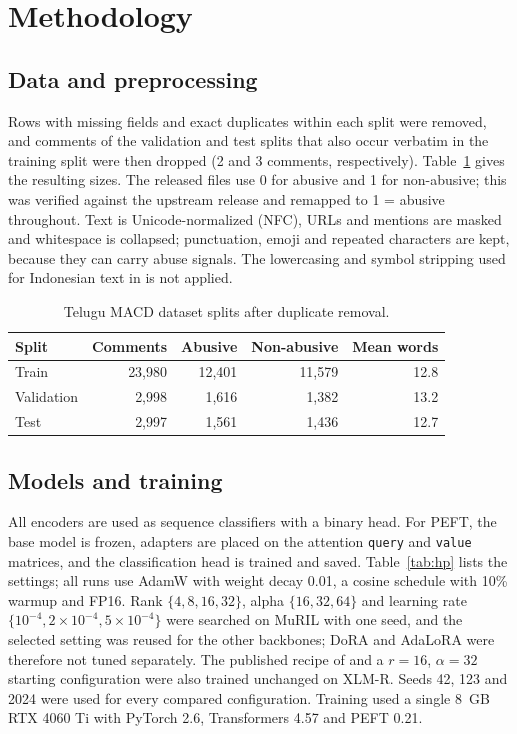 \documentclass{svproc}
\begin{document}
\section{Methodology}
\label{sec:method}
\subsection{Data and preprocessing}
Rows with missing fields and exact duplicates within each split were removed, and comments of the validation and test splits that also occur verbatim in the training split were then dropped (2 and 3 comments, respectively). Table~\ref{tab:data} gives the resulting sizes. The released files use 0 for abusive and 1 for non-abusive; this was verified against the upstream release and remapped to 1 = abusive throughout. Text is Unicode-normalized (NFC), URLs and mentions are masked and whitespace is collapsed; punctuation, emoji and repeated characters are kept, because they can carry abuse signals. The lowercasing and symbol stripping used for Indonesian text in \cite{kaunang2026indo} is not applied.

\begin{table}[t]
\caption{Telugu MACD dataset splits after duplicate removal.}
\label{tab:data}
\centering
\begin{tabular}{lrrrr}
\toprule
Split & Comments & Abusive & Non-abusive & Mean words \\
\midrule
Train      & 23,980 & 12,401 & 11,579 & 12.8 \\
Validation & 2,998  & 1,616  & 1,382  & 13.2 \\
Test       & 2,997  & 1,561  & 1,436  & 12.7 \\
\bottomrule
\end{tabular}
\end{table}

\subsection{Models and training}
All encoders are used as sequence classifiers with a binary head. For PEFT, the base model is frozen, adapters are placed on the attention \texttt{query} and \texttt{value} matrices, and the classification head is trained and saved. Table~\ref{tab:hp} lists the settings; all runs use AdamW \cite{loshchilov2019adamw} with weight decay 0.01, a cosine schedule with 10\% warmup and FP16. Rank $\{4,8,16,32\}$, alpha $\{16,32,64\}$ and learning rate $\{10^{-4},2\times10^{-4},5\times10^{-4}\}$ were searched on MuRIL with one seed, and the selected setting was reused for the other backbones; DoRA and AdaLoRA were therefore not tuned separately. The published recipe of \cite{kaunang2026indo} and a $r=16$, $\alpha=32$ starting configuration were also trained unchanged on XLM-R. Seeds 42, 123 and 2024 were used for every compared configuration. Training used a single 8~GB RTX 4060 Ti with PyTorch 2.6, Transformers \cite{wolf2020transformers} 4.57 and PEFT 0.21.
\end{document}
